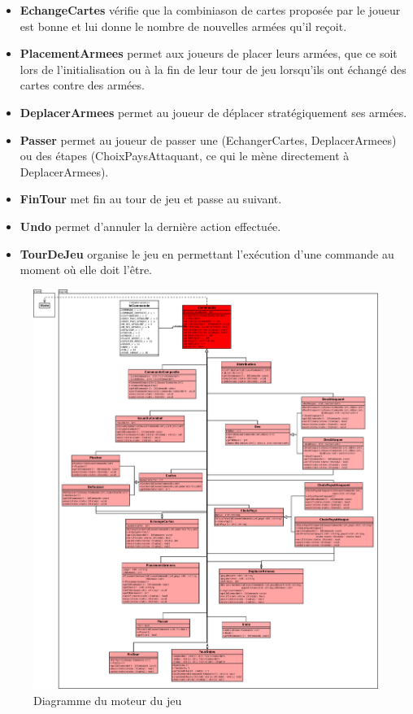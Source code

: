 \begin{itemize}
    \item \textbf{EchangeCartes} vérifie que la combiniason de cartes proposée par le joueur est bonne et lui donne le nombre de nouvelles armées qu'il reçoit.
    
    \item \textbf{PlacementArmees} permet aux joueurs de placer leurs armées, que ce soit lors de l'initialisation ou à la fin de leur tour de jeu lorsqu'ils ont échangé des cartes contre des armées.
    
    \item \textbf{DeplacerArmees} permet au joueur de déplacer stratégiquement ses armées.
    
    \item \textbf{Passer} permet au joueur de passer une (EchangerCartes, DeplacerArmees) ou des étapes (ChoixPaysAttaquant, ce qui le mène directement à DeplacerArmees).
    
    \item \textbf{FinTour} met fin au tour de jeu et passe au suivant.
    
    \item \textbf{Undo} permet d'annuler la dernière action effectuée.
    
    \item \textbf{TourDeJeu} organise le jeu en permettant l'exécution d'une commande au moment où elle doit l'être.
\end{itemize}

    \begin{figure}[!htbp]
        \centering
        \includegraphics[width=17cm]{Images/engine.png}
        \caption{Diagramme du moteur du jeu}
        \label{fig:moteur}
    \end{figure}
